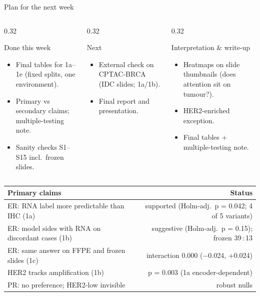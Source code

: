\documentclass[aspectratio=169,10pt]{beamer}
\begin{document}
\begin{frame}[t]{Plan for the next week}
\footnotesize
\begin{columns}[T]
\begin{column}{0.32\textwidth}
\begin{block}{Done this week}
\begin{itemize}
  \item Final tables for 1a--1e (fixed splits, one environment).
  \item Primary vs secondary claims; multiple-testing note.
  \item Sanity checks S1--S15 incl.\ frozen slides.
\end{itemize}
\end{block}
\end{column}
\begin{column}{0.32\textwidth}
\begin{block}{Next}
\begin{itemize}
  \item External check on CPTAC-BRCA (IDC slides; 1a/1b).
  \item Final report and presentation.
\end{itemize}
\end{block}
\end{column}
\begin{column}{0.32\textwidth}
\begin{block}{Interpretation \& write-up}
\begin{itemize}
  \item Heatmaps on slide thumbnails (does attention sit on tumour?).
  \item HER2-enriched exception.
  \item Final tables + multiple-testing note.
\end{itemize}
\end{block}
\end{column}
\end{columns}

\vspace{10pt}
\centering
\begin{tabular}{lr}
\toprule
Primary claims & Status \\
\midrule
ER: RNA label more predictable than IHC (1a) & supported (Holm-adj.\ p = 0.042; 4 of 5 variants) \\
ER: model sides with RNA on discordant cases (1b) & suggestive (Holm-adj.\ p = 0.15); frozen 39\,:\,13 \\
ER: same answer on FFPE and frozen slides (1c) & interaction 0.000 ($-$0.024, +0.024) \\
HER2 tracks amplification (1b) & p = 0.003 (1a encoder-dependent) \\
PR: no preference; HER2-low invisible & robust nulls \\
\bottomrule
\end{tabular}
\end{frame}
\end{document}
